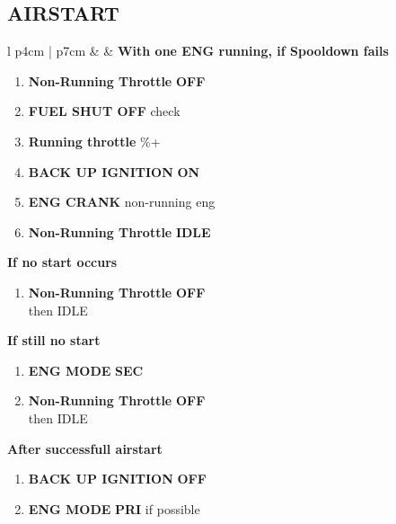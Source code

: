 \documentclass[8pt,usenames,dvipsnames,twoside]{article}
\begin{document}
		\subsection{AIRSTART}
		\begin{center}
			\begin{tabular}{l p{4cm} | p{7cm}}
				\toprule
				\textbullet &  & 
				\textbf{With one ENG running, if Spooldown fails}
				\begin{minipage}[t]{\linewidth}
					\begin{enumerate}[label=(\alph*)]
						\item \textbf{Non-Running Throttle} \dotfill \textbf{OFF}
						\item \textbf{FUEL SHUT OFF} \dotfill check
						\item \textbf{Running throttle} \%+
						\item \textbf{BACK UP IGNITION} \dotfill \textbf{ON}
						\item \textbf{ENG CRANK} \dotfill non-running eng
						\item \textbf{Non-Running Throttle} \dotfill \textbf{IDLE}
					\end{enumerate}
					\textbf{If no start occurs}
					\begin{enumerate}[label=(\alph*), resume]
						\item \textbf{Non-Running Throttle} \dotfill \textbf{OFF} \\
						\hfill then IDLE
					\end{enumerate}
					\textbf{If still no start}
					\begin{enumerate}[label=(\alph*), resume]
						\item \textbf{ENG MODE} \dotfill \textbf{SEC}
						\item \textbf{Non-Running Throttle} \dotfill \textbf{OFF} \\
						\hfill then IDLE
					\end{enumerate}
					\textbf{After successfull airstart}
					\begin{enumerate}[label=(\alph*), resume]
						\item \textbf{BACK UP IGNITION} \dotfill \textbf{OFF}
						\item \textbf{ENG MODE} \dotfill \textbf{PRI} if possible
					\end{enumerate}
				\end{minipage} \\
				\bottomrule
			\end{tabular}
		\end{center}
	
\end{document}
